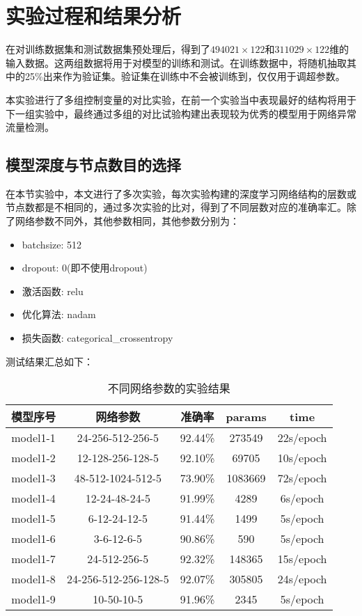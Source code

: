 \section{实验过程和结果分析}

在对训练数据集和测试数据集预处理后，得到了$494021 \times 122$和$311029 \times 122$维的输入数据。这两组数据将用于对模型的训练和测试。在训练数据中，将随机抽取其中的25\%出来作为验证集。验证集在训练中不会被训练到，仅仅用于调超参数。

本实验进行了多组控制变量的对比实验，在前一个实验当中表现最好的结构将用于下一组实验中，最终通过多组的对比试验构建出表现较为优秀的模型用于网络异常流量检测。

\subsection{模型深度与节点数目的选择}

在本节实验中，本文进行了多次实验，每次实验构建的深度学习网络结构的层数或节点数都是不相同的，通过多次实验的比对，得到了不同层数对应的准确率汇。除了网络参数不同外，其他参数相同，其他参数分别为：
\begin{itemize}
    \item batchsize: 512
    \item dropout: 0(即不使用dropout)
    \item 激活函数: relu
    \item 优化算法: nadam
    \item 损失函数: categorical\_crossentropy
\end{itemize}

测试结果汇总如下：
\begin{table}[htbp]
	\centering
	\caption{不同网络参数的实验结果}
	\begin{tabular}{c|c|c|c|c}
		\toprule
		模型序号 & 网络参数             & 准确率  & params  & time      \\
		\midrule
		model1-1   & 24-256-512-256-5     & 92.44\% & 273549  & 22s/epoch \\
		\midrule
		model1-2   & 12-128-256-128-5     & 92.10\% & 69705   & 10s/epoch \\
		\midrule
		model1-3   & 48-512-1024-512-5    & 73.90\% & 1083669 & 72s/epoch \\
		\midrule
		model1-4   & 12-24-48-24-5        & 91.99\% & 4289    & 6s/epoch  \\
		\midrule
		model1-5   & 6-12-24-12-5         & 91.44\% & 1499    & 5s/epoch  \\
		\midrule
		model1-6   & 3-6-12-6-5           & 90.86\% & 590     & 5s/epoch  \\
		\midrule
		model1-7   & 24-512-256-5         & 92.32\% & 148365  & 15s/epoch \\
		\midrule
		model1-8   & 24-256-512-256-128-5 & 92.07\% & 305805  & 24s/epoch \\
		\midrule
		model1-9   & 10-50-10-5           & 91.96\% & 2345    & 5s/epoch  \\
		\bottomrule
	\end{tabular}%
	\label{tab:exp1-1}%
\end{table}%

